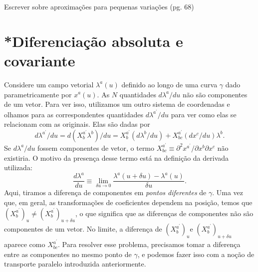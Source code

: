 {\color{red} Escrever sobre aproximações para pequenas variações (pg. 68)} 

\section{*Diferenciação absoluta e covariante}\label{sec:DiferenciacaoAbsolutaCovariante}

Considere um campo vetorial $ \lambda^a(u) $ definido ao longo de uma curva $ \gamma $ dado parametricamente por $ x^a(u) $. As $ N $ quantidades $ d \lambda^{a} / d u $ não são componentes de um vetor. Para ver isso, utilizamos um outro sistema de coordenadas e olhamos para as correspondentes quantidades $ d \lambda^{a^{\prime}} / d u $ para ver como elas se relacionam com as originais. Elas são dadas por
\begin{equation}\label{eq:TransformacaoCoordenadasDerivadaCurva}
d \lambda^{a^{\prime}} / d u=d\left(X_{b}^{a^{\prime}} \lambda^{b}\right) / d u=X_{b}^{a^{\prime}}\left(d \lambda^{b} / d u\right)+X_{b c}^{a^{\prime}}\left(d x^{c} / d u\right) \lambda^{b} .
\end{equation}
Se $ d \lambda^{a} / d u $ fossem componentes de vetor, o termo $ X_{b c}^{a^{\prime}} \equiv \partial^{2} x^{a^{\prime}} / \partial x^{b} \partial x^{c} $ não existiria. O motivo da presença desse termo está na definição da derivada utilizada:
\begin{equation}\label{eq:DerivadaTotalLambda}
\frac{d \lambda^{a}}{d u} \equiv \lim _{\delta u \rightarrow 0} \frac{\lambda^{a}(u+\delta u)-\lambda^{a}(u)}{\delta u} .
\end{equation}
Aqui, tiramos a diferença de componentes em \textit{pontos diferentes} de $ \gamma $. Uma vez que, em geral, as transformações de coeficientes dependem na posição, temos que $ \left(X_{b}^{a^{\prime}}\right)_{u} \neq\left(X_{b}^{a^{\prime}}\right)_{u+\delta u} $, o que significa que as diferenças de componentes não são componentes de um vetor. No limite, a diferença de $ \left(X_{b}^{a^{\prime}}\right)_{u} \text{e } \left(X_{b}^{a^{\prime}}\right)_{u+\delta u} $ aparece como $ X_{b c}^{a^{\prime}} $. Para resolver esse problema, precisamos tomar a diferença entre as componentes no mesmo ponto de $ \gamma $, e podemos fazer isso com a noção de transporte paralelo introduzida anteriormente.

